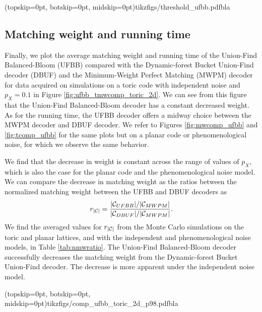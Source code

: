 \Figure[htb](topskip=0pt, botskip=0pt, midskip=0pt){tikzfigs/threshold_ufbb.pdf}{bla\label{threshold_ufbb}}


\subsection{Matching weight and running time}

Finally, we plot the average matching weight and running time of the Union-Find Balanced-Bloom (UFBB) compared with the Dynamic-forest Bucket Union-Find decoder (DBUF) and the Minimum-Weight Perfect Matching (MWPM) decoder for data acquired on simulations on a toric code with independent noise and $p_X = 0.1$ in Figure \ref{fig:ufbb_tmwcomp_toric_2d}. We can see from this figure that the Union-Find Balanced-Bloom decoder has a constant decreased weight. As for the running time, the UFBB decoder offers a midway choice between the MWPM decoder and DBUF decoder. We refer to Figures \ref{fig:mwcomp_ufbb} and \ref{fig:tcomp_ufbb} for the same plots but on a planar code or phenomenological noise, for which we observe the same behavior. 

We find that the decrease in weight is constant across the range of values of $p_X$, which is also the case for the planar code and the phenomenological noise model. We can compare the decrease in matching weight as the ratios between the normalized matching weight between the UFBB and DBUF decoders as
\begin{equation}
  r_{\lvert\mathcal{C}\rvert}=\frac{\lvert\mathcal{C}_{UFBB}\rvert/\lvert\mathcal{C}_{MWPM}\rvert}{\lvert\mathcal{C}_{DBUF}\rvert/\lvert\mathcal{C}_{MWPM}\rvert}. 
\end{equation}
We find the averaged values for $r_{\lvert\mathcal{C}\rvert}$ from the Monte Carlo simulations on the toric and planar lattices, and with the independent and phenomenological noise models, in Table \ref{tab:nmwratio}. The Union-Find Balanced-Bloom decoder successfully decreases the matching weight from the Dynamic-forest Bucket Union-Find decoder. The decrease is more apparent under the independent noise model. 

\Figure[htb](topskip=0pt, botskip=0pt, midskip=0pt){tikzfigs/comp_ufbb_toric_2d_p98.pdf}{bla\label{tmw_comp}}
